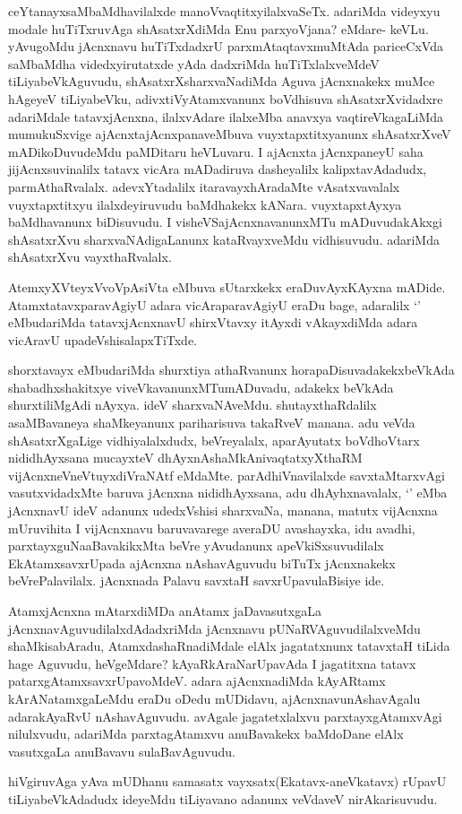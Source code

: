 \begin{artha}
ceYtanayxsaMbaMdhavilalxde manoVvaqtitxyilalxvaSeTx. adariMda videyxyu
modale huTiTxruvAga shAsatxrXdiMda Enu parxyoVjana? eMdare-
keVLu. yAvugoMdu jAcnxnavu huTiTxdadxrU parxmAtaqtavxmuMtAda
pariceCxVda saMbaMdha videdxyirutatxde yAda dadxriMda huTiTxlalxveMdeV
tiLiyabeVkAguvudu, shAsatxrXsharxvaNadiMda Aguva jAcnxnakekx muMce
hAgeyeV tiLiyabeVku, adivxtiVyAtamxvanunx boVdhisuva shAsatxrXvidadxre
adariMdale tatavxjAcnxna, ilalxvAdare ilalxeMba anavxya
vaqtireVkagaLiMda mumukuSxvige ajAcnxtajAcnxpanaveMbuva
vuyxtapxtitxyanunx shAsatxrXveV mADikoDuvudeMdu paMDitaru heVLuvaru. I
ajAcnxta jAcnxpaneyU saha jijAcnxsuvinalilx tatavx vicAra mADadiruva
dasheyalilx kalipxtavAdadudx, parmAthaRvalalx. adevxYtadalilx
itaravayxhAradaMte vAsatxvavalalx vuyxtapxtitxyu ilalxdeyiruvudu
baMdhakekx kANara. vuyxtapxtAyxya baMdhavanunx biDisuvudu. I
visheVSajAcnxnavanunxMTu mADuvudakAkxgi shAsatxrXvu
sharxvaNAdigaLanunx kataRvayxveMdu vidhisuvudu. adariMda shAsatxrXvu vayxthaRvalalx.  

AtemxyXVteyxVvoVpAsiVta eMbuva sUtarxkekx eraDuvAyxKAyxna
mADide. AtamxtatavxparavAgiyU adara vicAraparavAgiyU eraDu bage,
adaralilx `\stext' eMbudariMda tatavxjAcnxnavU shirxVtavxy itAyxdi
vAkayxdiMda adara vicAravU upadeVshisalapxTiTxde.

shorxtavayx eMbudariMda shurxtiya athaRvanunx
horapaDisuvadakekxbeVkAda shabadhxshakitxye viveVkavanunxMTumADuvadu,
adakekx beVkAda shurxtiliMgAdi nAyxya. ideV
sharxvaNAveMdu. shutayxthaRdalilx asaMBavaneya shaMkeyanunx
pariharisuva takaRveV manana. adu veVda shAsatxrXgaLige
vidhiyalalxdudx, beVreyalalx, aparAyutatx boVdhoV\s tarx
nididhAyxsana mucayxteV dhAyxnAshaMkAnivaqtatxyXthaRM
vijAcnxneVneVtuyxdiVraNAtf eMdaMte. parAdhiVnavilalxde savxtaMtarxvAgi
vasutxvidadxMte baruva jAcnxna nididhAyxsana, adu dhAyhxnavalalx,
`\stext' eMba jAcnxnavU ideV adanunx udedxVshisi sharxvaNa, manana,
matutx vijAcnxna mUruvihita I vijAcnxnavu baruvavarege averaDU
avashayxka, idu avadhi, parxtayxguNaaBavakikxMta beVre yAvudanunx
apeVkiSxsuvudilalx EkAtamxsavxrUpada ajAcnxna nAshavAguvudu biTuTx
jAcnxnakekx beVrePalavilalx. jAcnxnada Palavu savxtaH
savxrUpavulaBisiye ide.
\end{artha}

\begin{artha}
AtamxjAcnxna mAtarxdiMDa anAtamx jaDavasutxgaLa
jAcnxnavAguvudilalxdAdadxriMda jAcnxnavu pUNaRVAguvudilalxveMdu
shaMkisabAradu, AtamxdashaRnadiMdale elAlx jagatatxnunx tatavxtaH
tiLida hage Aguvudu, heVgeMdare? kAyaRkAraNarUpavAda I jagatitxna
tatavx patarxgAtamxsavxrUpavoMdeV. adara ajAcnxnadiMda kAyARtamx
kArANatamxgaLeMdu eraDu oDedu mUDidavu, ajAcnxnavunAshavAgalu
adarakAyaRvU nAshavAguvudu. avAgale jagatetxlalxvu parxtayxgAtamxvAgi
nilulxvudu, adariMda parxtagAtamxvu anuBavakekx baMdoDane elAlx
vasutxgaLa anuBavavu sulaBavAguvudu.

hiVgiruvAga yAva mUDhanu samasatx vayxsatx(Ekatavx-aneVkatavx) rUpavU
tiLiyabeVkAdadudx ideyeMdu tiLiyavano adanunx veVdaveV nirAkarisuvudu.
\end{artha}


